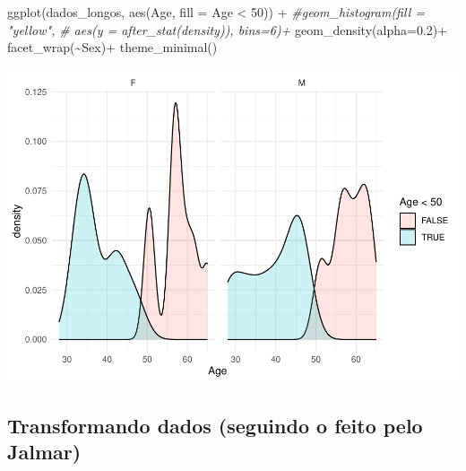 \documentclass[
]{article}
\newenvironment{Shaded}{\begin{snugshade}}{\end{snugshade}}
\newcommand{\AttributeTok}[1]{\textcolor[rgb]{0.77,0.63,0.00}{#1}}
\newcommand{\CommentTok}[1]{\textcolor[rgb]{0.56,0.35,0.01}{\textit{#1}}}
\newcommand{\DecValTok}[1]{\textcolor[rgb]{0.00,0.00,0.81}{#1}}
\newcommand{\FloatTok}[1]{\textcolor[rgb]{0.00,0.00,0.81}{#1}}
\newcommand{\FunctionTok}[1]{\textcolor[rgb]{0.00,0.00,0.00}{#1}}
\newcommand{\NormalTok}[1]{#1}
\newcommand{\SpecialCharTok}[1]{\textcolor[rgb]{0.00,0.00,0.00}{#1}}
\begin{document}
\begin{Shaded}
\begin{Highlighting}[]
\FunctionTok{ggplot}\NormalTok{(dados\_longos, }\FunctionTok{aes}\NormalTok{(Age, }\AttributeTok{fill =}\NormalTok{ Age }\SpecialCharTok{\textless{}} \DecValTok{50}\NormalTok{)) }\SpecialCharTok{+} 
  \CommentTok{\#geom\_histogram(fill = "yellow", }
  \CommentTok{\#               aes(y = after\_stat(density)), bins=6)+}
  \FunctionTok{geom\_density}\NormalTok{(}\AttributeTok{alpha=}\FloatTok{0.2}\NormalTok{)}\SpecialCharTok{+}
  \FunctionTok{facet\_wrap}\NormalTok{(}\SpecialCharTok{\textasciitilde{}}\NormalTok{Sex)}\SpecialCharTok{+}
  \FunctionTok{theme\_minimal}\NormalTok{()}
\end{Highlighting}
\end{Shaded}

\includegraphics{EDA__files/figure-latex/unnamed-chunk-5-4.pdf}

\hypertarget{transformando-dados-seguindo-o-feito-pelo-jalmar}{%
\subsection{Transformando dados (seguindo o feito pelo
Jalmar)}\label{transformando-dados-seguindo-o-feito-pelo-jalmar}}
\end{document}
